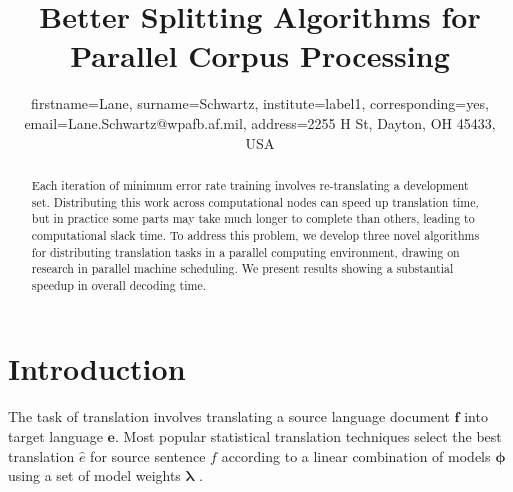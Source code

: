 \documentclass{pbml}
\begin{document}
\title{Better Splitting Algorithms for Parallel Corpus Processing}



\author{
  firstname=Lane,
  surname=Schwartz,
  institute=label1,
  corresponding=yes,
  email={Lane.Schwartz@wpafb.af.mil},
  address={2255 H St, Dayton, OH 45433, USA}
}


\PBMLmaketitle

%



\begin{abstract}
Each iteration of minimum error rate training involves re-translating a development set. Distributing this work across computational nodes can speed up translation time, but in practice some parts may take much longer to complete than others, leading to computational slack time. To address this problem, we develop three novel algorithms for distributing translation tasks in a parallel computing environment, drawing on research in parallel machine scheduling. We present results showing a substantial speedup in overall decoding time.
\end{abstract}



\section{Introduction}

The task of translation involves translating a source language document $\mathbf{f}$ into target language $\mathbf{e}$. Most popular statistical translation techniques select the best translation $\hat{e}$ for source sentence $f$ according to a linear combination of models $\bm{\phi}$ using a set of model weights $\bm{\lambda}$ \citep{ochney02}. 
\end{document}

